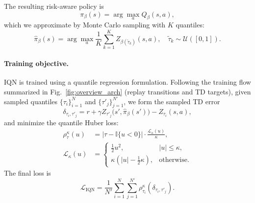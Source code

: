 The resulting risk-aware policy is
\begin{equation}
\pi_{\beta}(s)=\arg\max_{a} Q_{\beta}(s,a),
\label{eq:risk_policy}
\end{equation}
which we approximate by Monte Carlo sampling with $K$ quantiles:
\begin{equation}
\hat{\pi}_{\beta}(s)=
\arg\max_{a}\frac{1}{K}\sum_{k=1}^{K} Z_{\beta(\tilde{\tau}_k)}(s,a),
\quad
\tilde{\tau}_k \sim \mathcal{U}([0,1]).
\label{eq:risk_policy_mc}
\end{equation}

\paragraph{Training objective.}
IQN is trained using a quantile regression formulation. Following the training flow summarized in Fig.~\ref{fig:overview_arch} (replay transitions and TD targets), given sampled quantiles $\{\tau_i\}_{i=1}^{N}$ and $\{\tau'_j\}_{j=1}^{N'}$, we form the sampled TD error
\begin{equation}
\delta_{\tau_i,\tau'_j}
=
r + \gamma Z_{\tau'_j}\!\big(s', \hat{\pi}_{\beta}(s')\big)
- Z_{\tau_i}(s,a),
\label{eq:iqn_td}
\end{equation}
and minimize the quantile Huber loss:
\begin{align}
\rho^{\kappa}_{\tau}(u)
&=
|\tau-\mathbb{I}\{u<0\}|\cdot \frac{\mathcal{L}_{\kappa}(u)}{\kappa},
\label{eq:qhuber}\\
\mathcal{L}_{\kappa}(u)
&=
\begin{cases}
\frac{1}{2}u^{2}, & |u|\le\kappa,\\
\kappa(|u|-\frac{1}{2}\kappa), & \text{otherwise}.
\end{cases}
\nonumber
\end{align}
The final loss is
\begin{equation}
\mathcal{L}_{\mathrm{IQN}}
=
\frac{1}{N'}\sum_{i=1}^{N}\sum_{j=1}^{N'}
\rho^{\kappa}_{\tau_i}\!\left(\delta_{\tau_i,\tau'_j}\right).
\label{eq:iqn_loss}
\end{equation}

